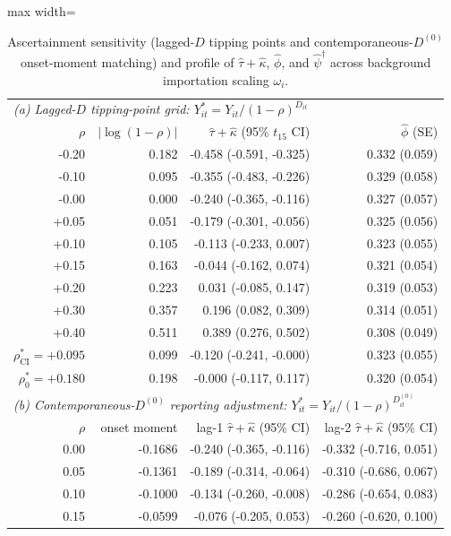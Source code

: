 \begin{table}[!t]
\centering
\caption{Ascertainment sensitivity (lagged-$D$ tipping points and contemporaneous-$D^{(0)}$ onset-moment matching) and profile of $\hat\tau+\hat\kappa$, $\hat\phi$, and $\hat\psi^\dagger$ across background importation scaling $\omega_i$.}
\label{tab:rev-ascert}
\footnotesize
\setlength{\tabcolsep}{3.5pt}
\begin{adjustbox}{max width=\linewidth}
\begin{tabular}{rrrr}
\toprule
\multicolumn{4}{l}{\emph{(a) Lagged-$D$ tipping-point grid: $Y^*_{it} = Y_{it}/(1-\rho)^{D_{it}}$}} \\
$\rho$ & $|\log(1-\rho)|$ & $\hat\tau+\hat\kappa$ (95\% $t_{15}$ CI) & $\hat\phi$ (SE) \\
\midrule
-0.20 & 0.182 & -0.458 (-0.591, -0.325) & 0.332 (0.059) \\
-0.10 & 0.095 & -0.355 (-0.483, -0.226) & 0.329 (0.058) \\
-0.00 & 0.000 & -0.240 (-0.365, -0.116) & 0.327 (0.057) \\
+0.05 & 0.051 & -0.179 (-0.301, -0.056) & 0.325 (0.056) \\
+0.10 & 0.105 & -0.113 (-0.233, 0.007) & 0.323 (0.055) \\
+0.15 & 0.163 & -0.044 (-0.162, 0.074) & 0.321 (0.054) \\
+0.20 & 0.223 & 0.031 (-0.085, 0.147) & 0.319 (0.053) \\
+0.30 & 0.357 & 0.196 (0.082, 0.309) & 0.314 (0.051) \\
+0.40 & 0.511 & 0.389 (0.276, 0.502) & 0.308 (0.049) \\
$\rho^*_{\mathrm{CI}} = +0.095$ & 0.099 & -0.120 (-0.241, -0.000) & 0.323 (0.055) \\
$\rho^*_0 = +0.180$ & 0.198 & -0.000 (-0.117, 0.117) & 0.320 (0.054) \\
\midrule
\multicolumn{4}{l}{\emph{(b) Contemporaneous-$D^{(0)}$ reporting adjustment: $Y^*_{it} = Y_{it}/(1-\rho)^{D^{(0)}_{it}}$}} \\
$\rho$ & onset moment & lag-1 $\hat\tau+\hat\kappa$ (95\% CI) & lag-2 $\hat\tau+\hat\kappa$ (95\% CI) \\
\midrule
0.00 & -0.1686 & -0.240 (-0.365, -0.116) & -0.332 (-0.716, 0.051) \\
0.05 & -0.1361 & -0.189 (-0.314, -0.064) & -0.310 (-0.686, 0.067) \\
0.10 & -0.1000 & -0.134 (-0.260, -0.008) & -0.286 (-0.654, 0.083) \\
0.15 & -0.0599 & -0.076 (-0.205, 0.053) & -0.260 (-0.620, 0.100) \\

\end{tabular}
\end{adjustbox}
\end{table}
